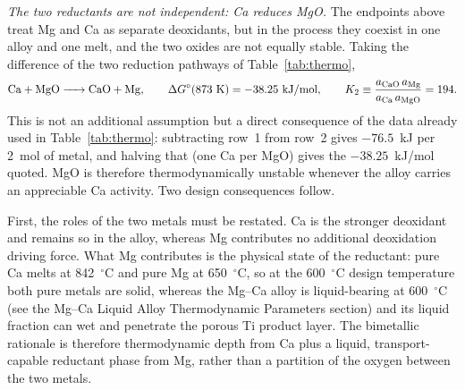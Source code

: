 \documentclass[pdflatex,sn-basic,Numbered]{sn-jnl}
\begin{document}
\emph{The two reductants are not independent: Ca reduces MgO.} The endpoints above treat Mg and Ca as separate deoxidants, but in the process they coexist in one alloy and one melt, and the two oxides are not equally stable. Taking the difference of the two reduction pathways of Table~\ref{tab:thermo},
\begin{equation}
\label{eq:camgo}
\ce{Ca + MgO -> CaO + Mg}, \qquad \Delta G^{\circ}(873~\mathrm{K}) = -38.25~\mathrm{kJ/mol}, \qquad K_2 \equiv \frac{a_{\ce{CaO}}\,a_{\mathrm{Mg}}}{a_{\mathrm{Ca}}\,a_{\ce{MgO}}} = 194 .
\end{equation}
This is not an additional assumption but a direct consequence of the data already used in Table~\ref{tab:thermo}: subtracting row~1 from row~2 gives $-76.5$~kJ per 2~mol of metal, and halving that (one Ca per MgO) gives the $-38.25$~kJ/mol quoted. MgO is therefore thermodynamically unstable whenever the alloy carries an appreciable Ca activity. Two design consequences follow.

First, the roles of the two metals must be restated. Ca is the stronger deoxidant and remains so in the alloy, whereas Mg contributes no additional deoxidation driving force. What Mg contributes is the physical state of the reductant: pure Ca melts at 842~$^{\circ}$C and pure Mg at 650~$^{\circ}$C, so at the 600~$^{\circ}$C design temperature both pure metals are solid, whereas the Mg--Ca alloy is liquid-bearing at 600~$^{\circ}$C (see the Mg--Ca Liquid Alloy Thermodynamic Parameters section) and its liquid fraction can wet and penetrate the porous Ti product layer. The bimetallic rationale is therefore thermodynamic depth from Ca plus a liquid, transport-capable reductant phase from Mg, rather than a partition of the oxygen between the two metals.
\end{document}
